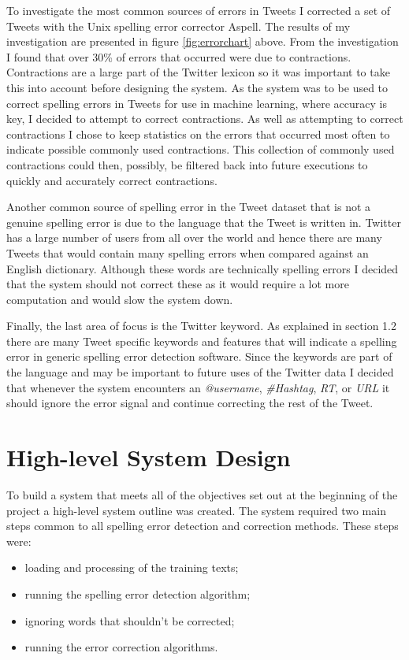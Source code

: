 To investigate the most common sources of errors in Tweets I corrected a set of Tweets with the Unix spelling error corrector Aspell. The results of my investigation are presented in figure \ref{fig:errorchart} above. From the investigation I found that over 30\% of errors that occurred were due to contractions. Contractions are a large part of the Twitter lexicon so it was important to take this into account before designing the system. As the system was to be used to correct spelling errors in Tweets for use in machine learning, where accuracy is key, I decided to attempt to correct contractions. As well as attempting to correct contractions I chose to keep statistics on the errors that occurred most often to indicate possible commonly used contractions. This collection of commonly used contractions could then, possibly, be filtered back into future executions to quickly and accurately correct contractions.

Another common source of spelling error in the Tweet dataset that is not a genuine spelling error is due to the language that the Tweet is written in. Twitter has a large number of users from all over the world and hence there are many Tweets that would contain many spelling errors when compared against an English dictionary. Although these words are technically spelling errors I decided that the system should not correct these as it would require a lot more computation and would slow the system down.

Finally, the last area of focus is the Twitter keyword. As explained in section 1.2 there are many Tweet specific keywords and features that will indicate a spelling error in generic spelling error detection software. Since the keywords are part of the language and may be important to future uses of the Twitter data I decided that whenever the system encounters an \emph{@username}, \emph{\#Hashtag}, \emph{RT}, or \emph{URL} it should ignore the error signal and continue correcting the rest of the Tweet.

\section{High-level System Design}
To build a system that meets all of the objectives set out at the beginning of the project a high-level system outline was created. The system required two main steps common to all spelling error detection and correction methods. These steps were:
\begin{itemize}
	\item
	loading and processing of the training texts;
	\item
	running the spelling error detection algorithm;
	\item
	ignoring words that shouldn't be corrected;
	\item
	running the error correction algorithms.
\end{itemize}

